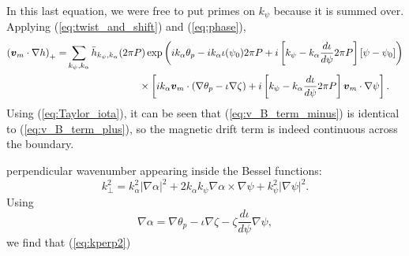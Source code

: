 \documentclass[11pt,letter]{article}
\newcommand{\vect}[1]{\mbox{\boldmath $#1$}}
\begin{document}
In this last equation, we were free to put primes on $k_\psi$ because it is summed over. Applying 
(\ref{eq:twist_and_shift}) and (\ref{eq:phase}),
\begin{align}
\left(\vect{v}_{m}\cdot \nabla h \right)_+
=& 
\sum_{k_\psi,k_\alpha} \bar{h}_{k_\psi,k_\alpha}(2\pi P) 
\exp \left( i k_\alpha \theta_p   -i k_\alpha \iota(\psi_0) 2\pi P+ i \left[ k_\psi - k_\alpha \frac{d\iota}{d\psi}  2 \pi P\right] [\psi - \psi_0] \right) \nonumber \\
& \hspace{1in} \times \left[ i k_\alpha \vect{v}_{m}\cdot \left(\nabla \theta_p - \iota \nabla\zeta \right) + i \left[ k_\psi - k_\alpha \frac{d\iota}{d\psi}  2 \pi P\right] \vect{v}_{m}\cdot\nabla\psi \right].
\label{eq:v_B_term_plus}
\end{align}
Using (\ref{eq:Taylor_iota}), it can be seen that (\ref{eq:v_B_term_minus}) is identical to  (\ref{eq:v_B_term_plus}),
so the magnetic drift term is indeed continuous across the boundary.


perpendicular wavenumber appearing inside the Bessel functions:
\begin{equation}
k_{\perp}^2 = k_\alpha^2 |\nabla \alpha|^2 + 2 k_\alpha k_\psi \nabla\alpha\times\nabla\psi + k_\psi^2 |\nabla\psi|^2.
\label{eq:kperp2}
\end{equation}
Using
\begin{equation}
\nabla\alpha = \nabla\theta_p - \iota \nabla\zeta - \zeta \frac{d\iota}{d\psi} \nabla\psi,
\end{equation}
we find that (\ref{eq:kperp2}) 
\end{document}
